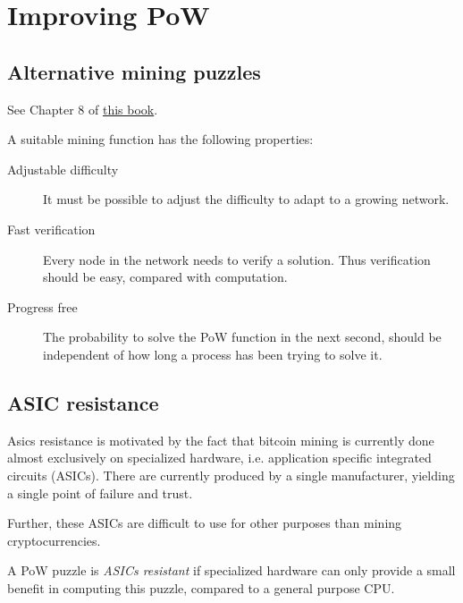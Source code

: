 
\section{Improving PoW}



\subsection{Alternative mining puzzles}
See Chapter 8 of \href{https://d28rh4a8wq0iu5.cloudfront.net/bitcointech/readings/princeton_bitcoin_book.pdf}{this book}.

\begin{definition}
A suitable mining function has the following properties:
\begin{description}
	\item[Adjustable difficulty] It must be possible to adjust the difficulty to adapt to a growing network.
	\item[Fast verification] Every node in the network needs to verify a solution. Thus verification should be easy, compared with computation.
	\item[Progress free] The probability to solve the PoW function in the next second, should be independent of how long a process has been trying to solve it.
\end{description}
\end{definition}


\subsection{ASIC resistance}
Asics resistance is motivated by the fact that bitcoin mining is currently done almost exclusively on specialized hardware, i.e. application specific integrated circuits (ASICs). There are currently produced by a single manufacturer, yielding a single point of failure and trust. 

Further, these ASICs are difficult to use for other purposes than mining cryptocurrencies.

\begin{definition}A PoW puzzle is \emph{ASICs resistant}
if specialized hardware can only provide a small benefit in computing this puzzle, compared to a general purpose CPU.
\end{definition}

